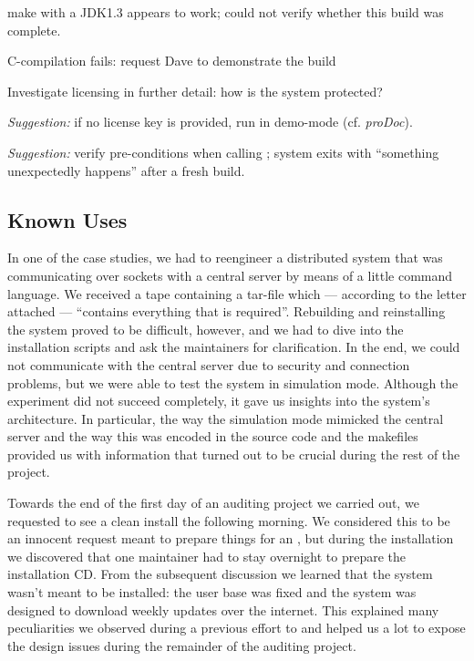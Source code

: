 \documentclass[a4paper,10pt,twoside]{book}
\begin{document}
\begin{bulletlist}
  \item make with a JDK1.3 appears to work; could not verify whether this build was complete.

  \item C-compilation fails: request Dave to demonstrate the build

  \item Investigate licensing in further detail: how is the system protected?

  \item \emph{Suggestion:}
if no license key is provided, run in demo-mode (cf. \emph{proDoc}).

  \item \emph{Suggestion:}
verify pre-conditions when calling ; system exits with ``something unexpectedly happens'' after a fresh build.
\end{bulletlist}

\subsection*{Known Uses}

In one of the  case studies, we had to reengineer a distributed system that was communicating over sockets with a central server by means of a little command language. We received a tape containing a tar-file which --- according to the letter attached --- ``contains everything that is required''. Rebuilding and reinstalling the system proved to be difficult, however, and we had to dive into the installation scripts and ask the maintainers for clarification. In the end, we could not communicate with the central server due to security and connection problems, but we were able to test the system in simulation mode. Although the experiment did not succeed completely, it gave us insights into the system's architecture. In particular, the way the simulation mode mimicked the central server and the way this was encoded in the source code and the makefiles provided us with information that turned out to be crucial during the rest of the project.

Towards the end of the first day of an auditing project we carried out, we requested to see a clean install the following morning. We considered this to be an innocent request meant to prepare things for an , but during the installation we discovered that one maintainer had to stay overnight to prepare the installation CD. From the subsequent discussion we learned that the system wasn't meant to be installed: the user base was fixed and the system was designed to download weekly updates over the internet. This explained many peculiarities we observed during a previous effort to  and helped us a lot to expose the design issues during the remainder of the auditing project.
\end{document}
